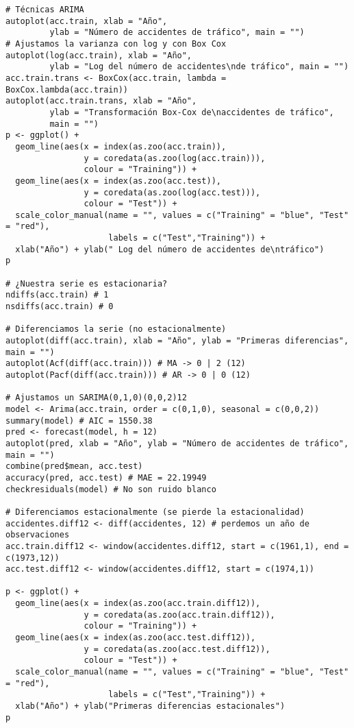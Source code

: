 \documentclass[12pt,a4paper,oneside]{article}
\begin{document}
\begin{Verbatim}[fontsize=\footnotesize]
# Técnicas ARIMA
autoplot(acc.train, xlab = "Año",
         ylab = "Número de accidentes de tráfico", main = "")
# Ajustamos la varianza con log y con Box Cox
autoplot(log(acc.train), xlab = "Año",
         ylab = "Log del número de accidentes\nde tráfico", main = "")
acc.train.trans <- BoxCox(acc.train, lambda = BoxCox.lambda(acc.train))
autoplot(acc.train.trans, xlab = "Año",
         ylab = "Transformación Box-Cox de\naccidentes de tráfico",
         main = "")
p <- ggplot() +
  geom_line(aes(x = index(as.zoo(acc.train)),
                y = coredata(as.zoo(log(acc.train))),
                colour = "Training")) +
  geom_line(aes(x = index(as.zoo(acc.test)),
                y = coredata(as.zoo(log(acc.test))),
                colour = "Test")) +
  scale_color_manual(name = "", values = c("Training" = "blue", "Test" = "red"),
                     labels = c("Test","Training")) +
  xlab("Año") + ylab(" Log del número de accidentes de\ntráfico")
p

# ¿Nuestra serie es estacionaria?
ndiffs(acc.train) # 1
nsdiffs(acc.train) # 0

# Diferenciamos la serie (no estacionalmente)
autoplot(diff(acc.train), xlab = "Año", ylab = "Primeras diferencias", main = "")
autoplot(Acf(diff(acc.train))) # MA -> 0 | 2 (12)
autoplot(Pacf(diff(acc.train))) # AR -> 0 | 0 (12)

# Ajustamos un SARIMA(0,1,0)(0,0,2)12
model <- Arima(acc.train, order = c(0,1,0), seasonal = c(0,0,2))
summary(model) # AIC = 1550.38
pred <- forecast(model, h = 12)
autoplot(pred, xlab = "Año", ylab = "Número de accidentes de tráfico", main = "")
combine(pred$mean, acc.test)
accuracy(pred, acc.test) # MAE = 22.19949
checkresiduals(model) # No son ruido blanco

# Diferenciamos estacionalmente (se pierde la estacionalidad)
accidentes.diff12 <- diff(accidentes, 12) # perdemos un año de observaciones
acc.train.diff12 <- window(accidentes.diff12, start = c(1961,1), end = c(1973,12))
acc.test.diff12 <- window(accidentes.diff12, start = c(1974,1))

p <- ggplot() +
  geom_line(aes(x = index(as.zoo(acc.train.diff12)),
                y = coredata(as.zoo(acc.train.diff12)),
                colour = "Training")) +
  geom_line(aes(x = index(as.zoo(acc.test.diff12)),
                y = coredata(as.zoo(acc.test.diff12)),
                colour = "Test")) +
  scale_color_manual(name = "", values = c("Training" = "blue", "Test" = "red"),
                     labels = c("Test","Training")) +
  xlab("Año") + ylab("Primeras diferencias estacionales")
p


\end{Verbatim}
\end{document}
